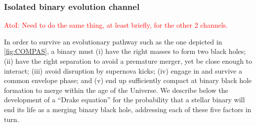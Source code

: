 \documentclass[iop,onecolumn]{revtex4}
\newcommand{\ajf}[1]{\textcolor{red}{AtoI: #1}}
\begin{document}
\subsubsection{Isolated binary evolution channel}
\ajf{Need to do the same thing, at least briefly, for the other 2 channels.}

In order to survive an evolutionary pathway such as the one depicted in \autoref{fig:COMPAS}, a binary must (i) have the right masses to form two black holes; (ii) have the right separation to avoid a premature merger, yet be close enough to interact; (iii) avoid disruption by supernova kicks; (iv) engage in and survive a common envelope phase; and (v) end up sufficiently compact at binary black hole formation to merge within the age of the Universe. We describe below the development of a ``Drake equation'' for the probability that a stellar binary will end its life as a merging binary black hole, addressing each of these five factors in turn.
\end{document}
